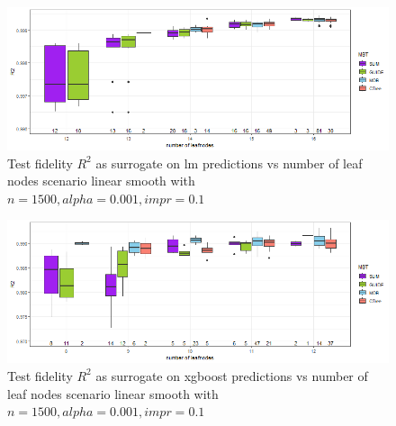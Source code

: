 \begin{figure}[!htb]
     \centering
    \includegraphics[width=14cm]{Figures/simulations/batchtools/basic_scenarios/linear_smooth/ls_1000_lm_r2_test.png}
    \caption{Test fidelity $R^2$ as surrogate on lm predictions vs number of leaf nodes scenario linear smooth with $n=1500, alpha = 0.001, impr = 0.1$}
\label{fig:app_ls_1000_lm_r2_test}
\end{figure} 

\begin{figure}[!htb]
     \centering
     
    \includegraphics[width=14cm]{Figures/simulations/batchtools/basic_scenarios/linear_smooth/ls_1000_xgboost_r2_test.png}
    \caption{Test fidelity $R^2$ as surrogate on xgboost predictions vs number of leaf nodes scenario linear smooth with $n=1500, alpha = 0.001, impr = 0.1$}
    \label{fig:app_ls_1000_xgboost_r2_test}
\end{figure} 



